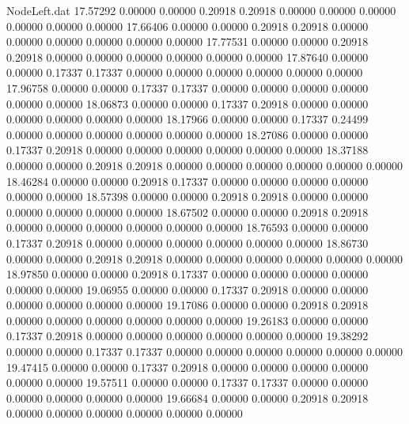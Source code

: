 \begin{filecontents}{NodeLeft.dat}
  17.57292    0.00000    0.00000     0.20918    0.20918    0.00000    0.00000    0.00000    0.00000    0.00000    0.00000
  17.66406    0.00000    0.00000     0.20918    0.20918    0.00000    0.00000    0.00000    0.00000    0.00000    0.00000
  17.77531    0.00000    0.00000     0.20918    0.20918    0.00000    0.00000    0.00000    0.00000    0.00000    0.00000
  17.87640    0.00000    0.00000     0.17337    0.17337    0.00000    0.00000    0.00000    0.00000    0.00000    0.00000
  17.96758    0.00000    0.00000     0.17337    0.17337    0.00000    0.00000    0.00000    0.00000    0.00000    0.00000
  18.06873    0.00000    0.00000     0.17337    0.20918    0.00000    0.00000    0.00000    0.00000    0.00000    0.00000
  18.17966    0.00000    0.00000     0.17337    0.24499    0.00000    0.00000    0.00000    0.00000    0.00000    0.00000
  18.27086    0.00000    0.00000     0.17337    0.20918    0.00000    0.00000    0.00000    0.00000    0.00000    0.00000
  18.37188    0.00000    0.00000     0.20918    0.20918    0.00000    0.00000    0.00000    0.00000    0.00000    0.00000
  18.46284    0.00000    0.00000     0.20918    0.17337    0.00000    0.00000    0.00000    0.00000    0.00000    0.00000
  18.57398    0.00000    0.00000     0.20918    0.20918    0.00000    0.00000    0.00000    0.00000    0.00000    0.00000
  18.67502    0.00000    0.00000     0.20918    0.20918    0.00000    0.00000    0.00000    0.00000    0.00000    0.00000
  18.76593    0.00000    0.00000     0.17337    0.20918    0.00000    0.00000    0.00000    0.00000    0.00000    0.00000
  18.86730    0.00000    0.00000     0.20918    0.20918    0.00000    0.00000    0.00000    0.00000    0.00000    0.00000
  18.97850    0.00000    0.00000     0.20918    0.17337    0.00000    0.00000    0.00000    0.00000    0.00000    0.00000
  19.06955    0.00000    0.00000     0.17337    0.20918    0.00000    0.00000    0.00000    0.00000    0.00000    0.00000
  19.17086    0.00000    0.00000     0.20918    0.20918    0.00000    0.00000    0.00000    0.00000    0.00000    0.00000
  19.26183    0.00000    0.00000     0.17337    0.20918    0.00000    0.00000    0.00000    0.00000    0.00000    0.00000
  19.38292    0.00000    0.00000     0.17337    0.17337    0.00000    0.00000    0.00000    0.00000    0.00000    0.00000
  19.47415    0.00000    0.00000     0.17337    0.20918    0.00000    0.00000    0.00000    0.00000    0.00000    0.00000
  19.57511    0.00000    0.00000     0.17337    0.17337    0.00000    0.00000    0.00000    0.00000    0.00000    0.00000
  19.66684    0.00000    0.00000     0.20918    0.20918    0.00000    0.00000    0.00000    0.00000    0.00000    0.00000

\end{filecontents}
